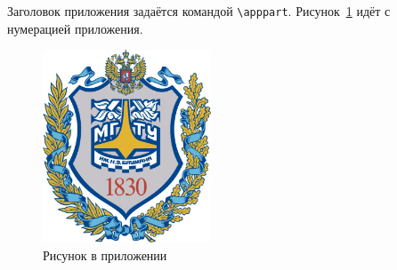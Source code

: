     

Заголовок приложения задаётся командой \texttt{\textbackslash apppart}. Рисунок~\ref{fig:a1} идёт с нумерацией приложения.

\begin{figure}
    \centering
    \includegraphics[width=5cm]{inc/bmstu}
    \caption{Рисунок в приложении}
    \label{fig:a1}
\end{figure}

\blindtext[1]
